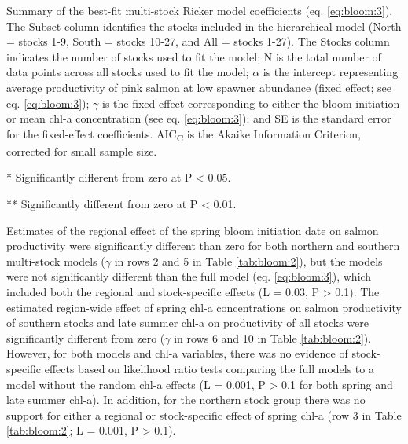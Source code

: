 \begin{table}[htbp]
  \small \centering \libertineLF
  \caption[Summary of the best-fit multi-stock Ricker model
           coefficients.]{Summary of the best-fit multi-stock Ricker model
           coefficients (eq. \ref{eq:bloom:3}). The Subset column identifies the
           stocks included in the hierarchical model (North = stocks 1-9, South
           = stocks 10-27, and All = stocks 1-27). The Stocks column indicates
           the number of stocks used to fit the model; N is the total number of
           data points across all stocks used to fit the model; $\alpha$ is the
           intercept representing average productivity of pink salmon at low
           spawner abundance (fixed effect; see eq. \ref{eq:bloom:3}); $\gamma$
           is the fixed effect corresponding to either the bloom initiation or
           mean chl-a concentration (see eq. \ref{eq:bloom:3}); and SE is the
           standard error for the fixed-effect coefficients.
           AIC\textsubscript{C} is the Akaike Information Criterion, corrected
           for small sample size.}
  \begin{threeparttable}
    
    \begin{tablenotes}
      {\footnotesize
        \item[*] Significantly different from zero at P \textless{} 0.05.
        \item[**] Significantly different from zero at P \textless{} 0.01.
      }
    \end{tablenotes}
  \end{threeparttable}
  \label{tab:bloom:2}
\end{table}

Estimates of the regional effect of the spring bloom initiation date on salmon
productivity were significantly different than zero for both northern and
southern multi-stock models (\(\gamma\) in rows 2 and 5 in Table
\ref{tab:bloom:2}), but the models were not significantly different than the
full model (eq. \ref{eq:bloom:3}), which included both the regional and
stock-specific effects (L = 0.03, P \textgreater{} 0.1). The estimated
region-wide effect of spring chl-a concentrations on salmon productivity of
southern stocks and late summer chl-a on productivity of all stocks were
significantly different from zero (\(\gamma\) in rows 6 and 10 in Table
\ref{tab:bloom:2}). However, for both models and chl-a variables, there was no
evidence of stock-specific effects based on likelihood ratio tests comparing the
full models to a model without the random chl-a effects (L = 0.001, P
\textgreater{} 0.1 for both spring and late summer chl-a). In addition, for the
northern stock group there was no support for either a regional or
stock-specific effect of spring chl-a (row 3 in Table \ref{tab:bloom:2}; L =
0.001, P \textgreater{} 0.1).

